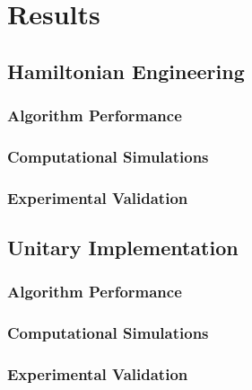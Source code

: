 \chapter{Results}



\section{Hamiltonian Engineering}

\lipsum[1-2]

\subsection{Algorithm Performance}

\lipsum[1-3]

\subsection{Computational Simulations}

\lipsum[1-6]

\subsection{Experimental Validation}

\lipsum[1-6]


\section{Unitary Implementation}

\lipsum[1-2]

\subsection{Algorithm Performance}

\lipsum[1-3]

\subsection{Computational Simulations}

\lipsum[1-6]

\subsection{Experimental Validation}

\lipsum[1-6]
